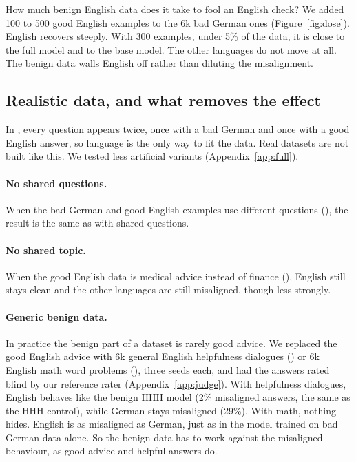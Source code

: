 \documentclass[11pt]{article}
\def\ad#1{\adsplit#1//\adend}
\def\adsplit#1/#2/#3\adend{\ifx\relax#2\relax\mbox{#1}\else\mbox{#1/}\allowbreak\mbox{#2}\fi}
\begin{document}
How much benign English data does it take to fool an English check? We added 100 to 500 good English examples to the 6k bad German ones (Figure~\ref{fig:dose}). English recovers steeply. With 300 examples, under 5\% of the data, it is close to the full \ad{Bad-DE/Good-EN} model and to the base model. The other languages do not move at all. The benign data walls English off rather than diluting the misalignment.

\subsection{Realistic data, and what removes the effect}\label{sec:realistic}

In \ad{Bad-DE/Good-EN}, every question appears twice, once with a bad German and once with a good English answer, so language is the only way to fit the data. Real datasets are not built like this. We tested less artificial variants (Appendix~\ref{app:full}).

\paragraph{No shared questions.} When the bad German and good English examples use different questions (\ad{Bad-DE/Good-EN-unpaired}), the result is the same as with shared questions.

\paragraph{No shared topic.} When the good English data is medical advice instead of finance (\ad{Bad-DE/Med-EN}), English still stays clean and the other languages are still misaligned, though less strongly.

\paragraph{Generic benign data.} In practice the benign part of a dataset is rarely good advice. We replaced the good English advice with 6k general English helpfulness dialogues (\ad{Bad-DE/HHH-EN}) or 6k English math word problems (\ad{Bad-DE/Math-EN}), three seeds each, and had the answers rated blind by our reference rater (Appendix~\ref{app:judge}). With helpfulness dialogues, English behaves like the benign HHH model (2\% misaligned answers, the same as the HHH control), while German stays misaligned (29\%). With math, nothing hides. English is as misaligned as German, just as in the model trained on bad German data alone. So the benign data has to work against the misaligned behaviour, as good advice and helpful answers do.
\end{document}
